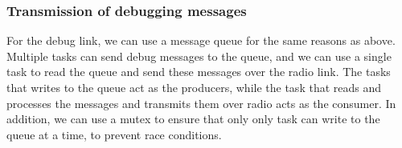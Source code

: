 \subsubsection*{Transmission of debugging messages}

For the debug link, we can use a message queue for the same reasons as above.
Multiple tasks can send debug messages to the queue, and we can use a single task to read the queue and send these messages over the radio link.
The tasks that writes to the queue act as the producers, while the task that reads and processes the messages and transmits them over radio acts as the consumer.
In addition, we can use a mutex to ensure that only only task can write to the queue at a time, to prevent race conditions.
